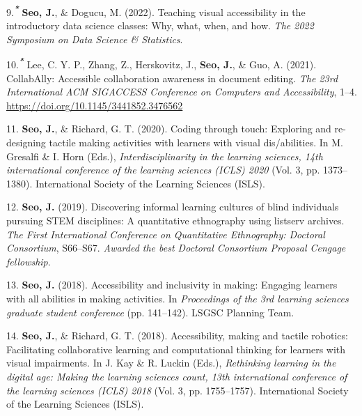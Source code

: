 \documentclass[11pt,a4paper,]{awesome-cv}
\begin{document}
\leavevmode{}%
9.\textsuperscript{\textbf{\emph{*}}} \textbf{Seo, J.}, \& Dogucu, M.
(2022). Teaching visual accessibility in the introductory data science
classes: Why, what, when, and how. \emph{The 2022 Symposium on Data
Science \& Statistics}.

\leavevmode{}%
10.\textsuperscript{\textbf{\emph{*}}} Lee, C. Y. P., Zhang, Z.,
Herskovitz, J., \textbf{Seo, J.}, \& Guo, A. (2021). CollabAlly:
Accessible collaboration awareness in document editing. \emph{The 23rd
International ACM SIGACCESS Conference on Computers and Accessibility},
1--4. \url{https://doi.org/10.1145/3441852.3476562}

\leavevmode{}%
11. \textbf{Seo, J.}, \& Richard, G. T. (2020). Coding through touch:
Exploring and re-designing tactile making activities with learners with
visual dis/abilities. In M. Gresalfi \& I. Horn (Eds.),
\emph{Interdisciplinarity in the learning sciences, 14th international
conference of the learning sciences (ICLS) 2020} (Vol. 3, pp.
1373--1380). International Society of the Learning Sciences (ISLS).

\leavevmode{}%
12. \textbf{Seo, J.} (2019). Discovering informal learning cultures of
blind individuals pursuing STEM disciplines: A quantitative ethnography
using listserv archives. \emph{The First International Conference on
Quantitative Ethnography: Doctoral Consortium}, S66--S67. \emph{Awarded
the best Doctoral Consortium Proposal Cengage fellowship}.

\leavevmode{}%
13. \textbf{Seo, J.} (2018). Accessibility and inclusivity in making:
Engaging learners with all abilities in making activities. In
\emph{Proceedings of the 3rd learning sciences graduate student
conference} (pp. 141--142). LSGSC Planning Team.

\leavevmode{}%
14. \textbf{Seo, J.}, \& Richard, G. T. (2018). Accessibility, making
and tactile robotics: Facilitating collaborative learning and
computational thinking for learners with visual impairments. In J. Kay
\& R. Luckin (Eds.), \emph{Rethinking learning in the digital age:
Making the learning sciences count, 13th international conference of the
learning sciences (ICLS) 2018} (Vol. 3, pp. 1755--1757). International
Society of the Learning Sciences (ISLS).
\end{document}
